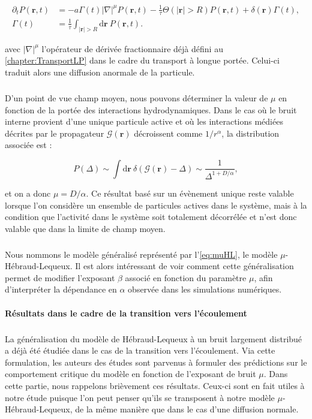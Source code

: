 \begin{equation}
\begin{aligned}
    \partial_t P(\mathbf{r}, t) &= -a\Gamma (t)|\nabla|^{\mu} P(\mathbf{r}, t) - \frac{1}{\tau}\Theta(|\mathbf{r}|>R)P(\mathbf{r}, t) + \delta(\mathbf{r})\Gamma (t),\\
     \Gamma (t) &= \frac{1}{\tau}\int_{|\mathbf{r}|>R}\mathrm{d}\mathbf{r}~P(\mathbf{r}, t).
\end{aligned}
    \label{eq:muHL}
\end{equation}

\noindent avec $|\nabla|^{\mu}$ l'opérateur de dérivée fractionnaire déjà défini au \autoref{chapter:TransportLP} dans le cadre du transport à longue portée. Celui-ci traduit alors une diffusion anormale de la particule.

\subparagraph{}D'un point de vue champ moyen, nous pouvons déterminer la valeur de $\mu$ en fonction de la portée des interactions hydrodynamiques. Dans le cas où le bruit interne provient d'une unique particule active et où les interactions médiées décrites par le propagateur $\mathcal{G}(\mathbf{r})$ décroissent comme $1/r^\alpha$, la distribution associée est :

\begin{equation}
	P(\Delta) \sim \int \mathrm{d}\mathbf{r}~\delta\left( \mathcal{G}(\mathbf{r})-\Delta \right)\sim \frac{1}{\Delta^{1+D/\alpha}},
\end{equation}

\noindent et on a donc $\mu = D/\alpha$. Ce résultat basé sur un évènement unique reste valable lorsque l'on considère un ensemble de particules actives dans le système, mais à la condition que l'activité dans le système soit totalement décorrélée et n'est donc valable que dans la limite de champ moyen.

\subparagraph{}Nous nommons le modèle généralisé représenté par l'\autoref{eq:muHL}, le modèle $\mu$-Hébraud-Lequeux. Il est alors intéressant de voir comment cette généralisation permet de modifier l'exposant $\beta$ associé en fonction du paramètre $\mu$, afin d'interpréter la dépendance en $\alpha$ observée dans les simulations numériques.

\paragraph{Résultats dans le cadre de la transition vers l'écoulement}

\subparagraph{}La généralisation du modèle de Hébraud-Lequeux à un bruit largement distribué a déjà été étudiée dans le cas de la transition vers l'écoulement. Via cette formulation, les auteurs des études \cite{lin_mean-field_2016, lin_microscopic_2018} sont parvenus à formuler des prédictions sur le comportement critique du modèle en fonction de l'exposant de bruit $\mu$. Dans cette partie, nous rappelons brièvement ces résultats. Ceux-ci sont en fait utiles à notre étude puisque l'on peut penser qu'ils se transposent à notre modèle $\mu$-Hébraud-Lequeux, de la même manière que dans le cas d'une diffusion normale.

